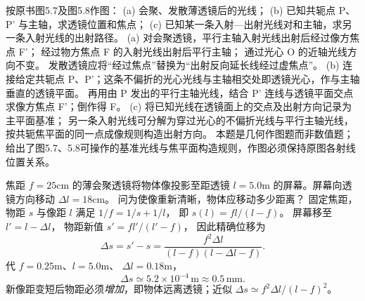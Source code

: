 按原书图5.7及图5.8作图：
(a) 会聚、发散薄透镜后的光线；
(b) 已知共轭点 P、P' 与主轴，求透镜位置和焦点；
(c) 已知某一条入射—出射光线对和主轴，求另一条入射光线的出射路径。
\exsolution
(a) 对会聚透镜，平行主轴入射光线出射后经过像方焦点 F'；
经过物方焦点 F 的入射光线出射后平行主轴；
通过光心 O 的近轴光线方向不变。
发散透镜应将“经过焦点”替换为“出射反向延长线经过虚焦点”。
(b) 连接给定共轭点 P、P'；这条不偏折的光心光线与主轴相交处即透镜光心，作与主轴垂直的透镜平面。
再用由 P 发出的平行主轴光线，结合 P' 连线与透镜平面交点求像方焦点 F'；倒作得 F。
(c) 将已知光线在透镜面上的交点及出射方向记录为主平面基准；
另一条入射光线可分解为穿过光心的不偏折光线与平行主轴光线，按共轭焦平面的同一点成像规则构造出射方向。
\excheck 本题是几何作图题而非数值题；给出了图5.7、5.8可操作的基准光线与焦平面构造规则，作图必须保持原图各射线位置关系。

焦距 $f=25$cm 的薄会聚透镜将物体像投影至距透镜 $l=5.0$m 的屏幕。屏幕向透镜方向移动
$\Delta l=18$cm。
问为使像重新清晰，物体应移动多少距离？
\exsolution
固定焦距，物距 $s$ 与像距 $l$ 满足
$1/f=1/s+1/l$，
即
$s(l)=fl/(l-f)$。
屏幕移至
$l'=l-\Delta l$，
物距新值
$s'=fl'/(l'-f)$，
因此精确位移为
\[
\Delta s=s'-s
=\frac{f^2\Delta l}{(l-f)(l-\Delta l-f)}.
\]
代 $f=0.25$m、$l=5.0$m、
$\Delta l=0.18$m，
\[
\boxed{\Delta s\simeq5.2\times10^{-4}\,\mathrm m
\approx0.5\,\mathrm{mm}}.
\]
\excheck 新像距变短后物距必须\emph{增加}，即物体远离透镜；近似 $\Delta s\simeq f^2\Delta l/(l-f)^2$。
